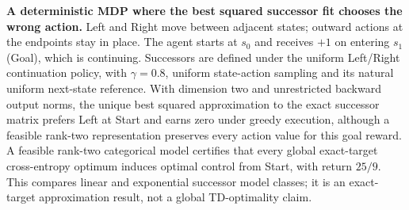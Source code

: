 \caption{\textbf{A deterministic MDP where the best squared successor fit chooses
the wrong action.} Left and Right move between adjacent states; outward actions
at the endpoints stay in place. The agent starts at $s_0$ and receives $+1$ on
entering $s_1$ (Goal), which is continuing. Successors are defined under the
uniform Left/Right continuation policy, with $\gamma=0.8$, uniform state-action
sampling and its natural uniform next-state reference. With dimension two and
unrestricted backward output norms, the unique best squared approximation to
the exact successor matrix prefers Left at Start and earns zero under greedy
execution, although a feasible rank-two representation preserves every action
value for this goal reward. A feasible rank-two categorical model certifies that
every global exact-target cross-entropy optimum induces optimal control from
Start, with return $25/9$. This compares linear and exponential successor model
classes; it is an exact-target approximation result, not a global TD-optimality
claim.}
\label{fig:deterministic-path}
